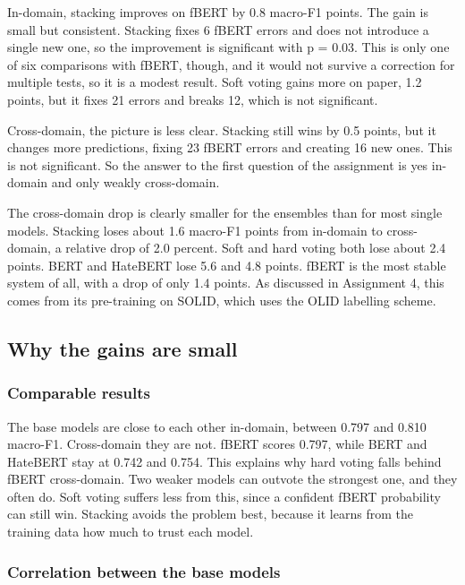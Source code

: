 \documentclass[11pt,a4paper]{article}
\begin{document}
In-domain, stacking improves on fBERT by 0.8 macro-F1 points. The gain is small but consistent. Stacking fixes 6 fBERT errors and does not introduce a single new one, so the improvement is significant with p = 0.03. This is only one of six comparisons with fBERT, though, and it would not survive a correction for multiple tests, so it is a modest result. Soft voting gains more on paper, 1.2 points, but it fixes 21 errors and breaks 12, which is not significant.

Cross-domain, the picture is less clear. Stacking still wins by 0.5 points, but it changes more predictions, fixing 23 fBERT errors and creating 16 new ones. This is not significant. So the answer to the first question of the assignment is yes in-domain and only weakly cross-domain.

The cross-domain drop is clearly smaller for the ensembles than for most single models. Stacking loses about 1.6 macro-F1 points from in-domain to cross-domain, a relative drop of 2.0 percent. Soft and hard voting both lose about 2.4 points. BERT and HateBERT lose 5.6 and 4.8 points. fBERT is the most stable system of all, with a drop of only 1.4 points. As discussed in Assignment 4, this comes from its pre-training on SOLID, which uses the OLID labelling scheme.

\subsection{Why the gains are small}

\subsubsection{Comparable results}

The base models are close to each other in-domain, between 0.797 and 0.810 macro-F1. Cross-domain they are not. fBERT scores 0.797, while BERT and HateBERT stay at 0.742 and 0.754. This explains why hard voting falls behind fBERT cross-domain. Two weaker models can outvote the strongest one, and they often do. Soft voting suffers less from this, since a confident fBERT probability can still win. Stacking avoids the problem best, because it learns from the training data how much to trust each model.

\subsubsection{Correlation between the base models}
\end{document}

